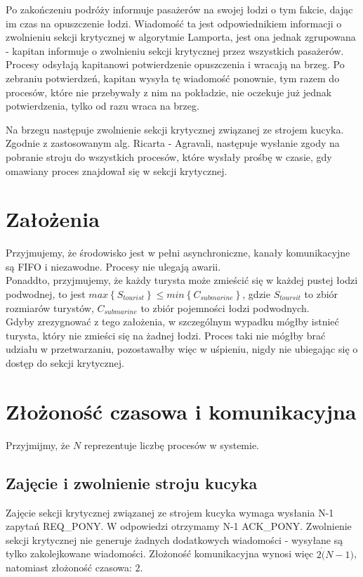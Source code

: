 \documentclass[a4paper]{article}
\begin{document}
Po zakończeniu podróży informuje pasażerów na swojej łodzi o tym fakcie, dając im czas na opuszczenie łodzi. Wiadomość ta jest odpowiednikiem informacji o zwolnieniu sekcji krytycznej w algorytmie Lamporta,
jest ona jednak zgrupowana - kapitan informuje o zwolnieniu sekcji krytycznej przez wszystkich pasażerów. Procesy odsyłają kapitanowi potwierdzenie opuszczenia i wracają na brzeg.
Po zebraniu potwierdzeń, kapitan wysyła tę wiadomość ponownie, tym razem do procesów, które nie przebywały z nim na pokładzie, nie oczekuje już jednak potwierdzenia, tylko od razu wraca na brzeg.

Na brzegu następuje zwolnienie sekcji krytycznej związanej ze strojem kucyka. Zgodnie z zastosowanym alg. Ricarta - Agravali, następuje wysłanie zgody na pobranie stroju do wszystkich
procesów, które wysłały prośbę w czasie, gdy omawiany proces znajdował się w sekcji krytycznej.

\resetlinenumber[1]\linenumbers
\section{Założenia}

Przyjmujemy, że środowisko jest w pełni asynchroniczne, 
kanały komunikacyjne są FIFO i niezawodne. Procesy nie ulegają awarii.\\
Ponaddto, przyjmujemy, że każdy turysta może zmieścić się w każdej pustej łodzi podwodnej, to jest
$max\left\{S_{tourist}\right\} \leq min\left\{C_{submarine}\right\}$,
gdzie $S_{toursit}$ to zbiór rozmiarów turystów,
$C_{submarine}$ to zbiór pojemności łodzi podwodnych.\\
Gdyby zrezygnować z tego założenia, w szczególnym wypadku mógłby istnieć turysta,
który nie zmieści się na żadnej łodzi. Proces taki nie mógłby brać udziału w przetwarzaniu,
pozostawałby więc w uśpieniu, nigdy nie ubiegając się o dostęp do sekcji krytycznej.

\resetlinenumber[1]\linenumbers
\section{Złożoność czasowa i komunikacyjna}
Przyjmijmy, że $N$ reprezentuje liczbę procesów w systemie.

\subsection{Zajęcie i zwolnienie stroju kucyka}
Zajęcie sekcji krytycznej związanej ze strojem kucyka wymaga wysłania N-1 zapytań REQ\_PONY. W odpowiedzi otrzymamy N-1 ACK\_PONY.
Zwolnienie sekcji krytycznej nie generuje żadnych dodatkowych wiadomości - wysyłane są tylko zakolejkowane wiadomości.
Złożoność komunikacyjna wynosi więc $2\dot(N-1)$, natomiast złożoność czasowa: $2$.
\end{document}
